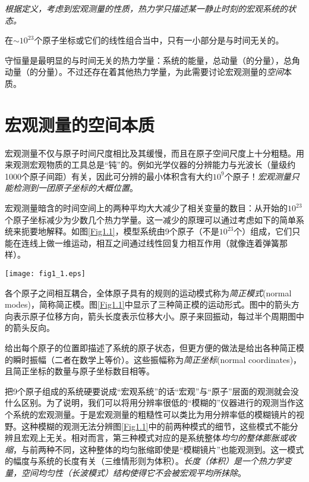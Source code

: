 {\it 根据定义，考虑到宏观测量的性质，热力学只描述某一静止时刻的宏观系统的状态。}

在$\sim 10^{23}$个原子坐标或它们的线性组合当中，只有一小部分是与时间无关的。

守恒量是最明显的与时间无关的热力学量：系统的能量，总动量（的分量），总角动量（的分量）。不过还存在着其他热力学量，为此需要讨论宏观测量的{\it 空间}本质。

\section{宏观测量的空间本质}
\label{sec1.2}
宏观测量不仅与原子时间尺度相比及其缓慢，而且在原子空间尺度上十分粗糙。用来观测宏观物质的工具总是“钝”的。例如光学仪器的分辨能力与光波长（量级约1000个原子间距）有关，因此可分辨的最小体积含有大约$10^9$个原子！{\it 宏观测量只能检测到一团原子坐标的大概位置}。

宏观测量暗含的时间空间上的两种平均大大减少了相关变量的数目：从开始的$10^{23}$个原子坐标减少为少数几个热力学量。这一减少的原理可以通过考虑如下的简单系统来扼要地解释。如图\ref{Fig1.1}，模型系统由9个原子（不是$10^{23}$个）组成，它们只能在连线上做一维运动，相互之间通过线性回复力相互作用（就像连着弹簧那样）。

{
	\centering
	\texttt{[image: fig1\_1.eps]} 
	\label{Fig1.1}
}

各个原子之间相互耦合，全体原子具有的规则的运动模式称为{\it 简正模式}(normal modes)，简称简正模。图\ref{Fig1.1}中显示了三种简正模的运动形式。图中的箭头方向表示原子位移方向，箭头长度表示位移大小。原子来回振动，每过半个周期图中的箭头反向。

给出每个原子的位置即描述了系统的原子状态，但更方便的做法是给出各种简正模的瞬时振幅（二者在数学上等价）。这些振幅称为{\it 简正坐标}(normal coordinates)，且简正坐标的数量与原子坐标数目相等。

把9个原子组成的系统硬要说成“宏观系统”的话“宏观”与“原子”层面的观测就会没什么区别。为了说明，我们可以将用分辨率很低的“模糊的”仪器进行的观测当作这个系统的宏观测量。于是宏观测量的粗糙性可以类比为用分辨率低的模糊镜片的视野。这种模糊的观测无法分辨图\ref{Fig1.1}中的前两种模式的细节，这些模式不能分辨且宏观上无关。相对而言，第三种模式对应的是系统整体{\it 均匀的整体膨胀或收缩}，与前两种不同，这种整体的均匀胀缩即使是“模糊镜片”也能观测到。这一模式的幅度与系统的长度有关（三维情形则为体积）。{\it 长度（体积）是一个热力学变量，空间均匀性（长波模式）结构使得它不会被宏观平均所抹除}。

